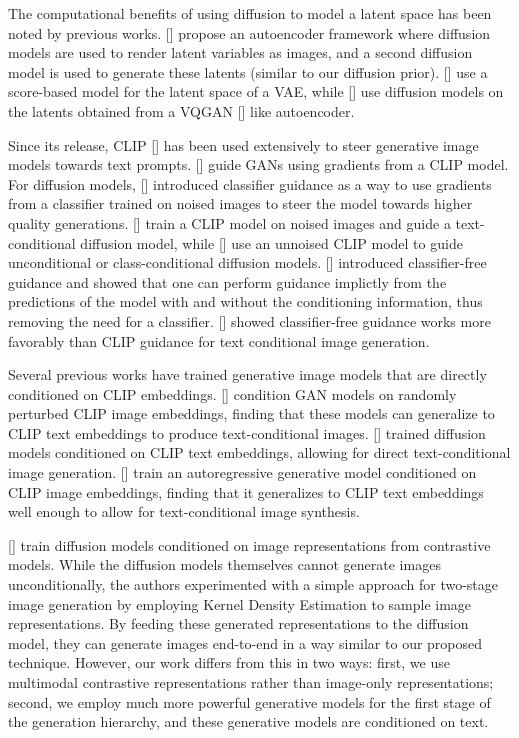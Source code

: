 \documentclass{article}
\newcommand{\shortcite}[1]{[\citenum{#1}]}
\newcommand{\namecite}[1]{\citeauthor{#1} [\citenum{#1}]}
\begin{document}
The computational benefits of using diffusion to model a latent space has been noted by previous works. \namecite{diffae} propose an autoencoder framework where diffusion models are used to render latent variables as images, and a second diffusion model is used to generate these latents (similar to our diffusion prior). \namecite{scorelatent} use a score-based model for the latent space of a VAE, while \namecite{latentdiffusion} use diffusion models on the latents obtained from a VQGAN \shortcite{vqgan} like autoencoder.

Since its release, CLIP \shortcite{clip} has been used extensively to steer generative image models towards text prompts. \namecite{clipglass,styleclip,bigsleep,stylegannada} guide GANs using gradients from a CLIP model. For diffusion models, \namecite{sotapaper} introduced classifier guidance as a way to use gradients from a classifier trained on noised images to steer the model towards higher quality generations. \namecite{glide} train a CLIP model on noised images and guide a text-conditional diffusion model, while \namecite{clipdiff,secondarymodelmethod} use an unnoised CLIP model to guide unconditional or class-conditional diffusion models. \namecite{uncond} introduced classifier-free guidance and showed that one can perform guidance implictly from the predictions of the model with and without the conditioning information, thus removing the need for a classifier. \namecite{glide} showed classifier-free guidance works more favorably than CLIP guidance for text conditional image generation. 

Several previous works have trained generative image models that are directly conditioned on CLIP embeddings. \namecite{lafite} condition GAN models on randomly perturbed CLIP image embeddings, finding that these models can generalize to CLIP text embeddings to produce text-conditional images. \namecite{vdiffusion} trained diffusion models conditioned on CLIP text embeddings, allowing for direct text-conditional image generation. \namecite{clipgen} train an autoregressive generative model conditioned on CLIP image embeddings, finding that it generalizes to CLIP text embeddings well enough to allow for text-conditional image synthesis.

\namecite{invertingssl} train diffusion models conditioned on image representations from contrastive models. While the diffusion models themselves cannot generate images unconditionally, the authors experimented with a simple approach for two-stage image generation by employing Kernel Density Estimation to sample image representations. By feeding these generated representations to the diffusion model, they can generate images end-to-end in a way similar to our proposed technique. However, our work differs from this in two ways: first, we use multimodal contrastive representations rather than image-only representations; second, we employ much more powerful generative models for the first stage of the generation hierarchy, and these generative models are conditioned on text.
\end{document}
